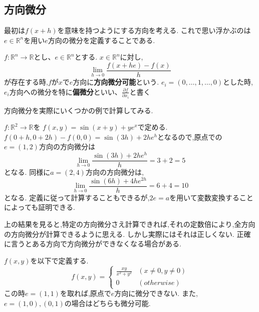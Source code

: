 \subsection{方向微分}
最初は$f(x+h)$を意味を持つようにする方向を考える.
これで思い浮かぶのは$e \in \mathbb{R}^n$を用い$e$方向の微分を定義することである.
\begin{dfn}
$f:\mathbb{R}^n \to \mathbb{R}$とし、$e \in \mathbb{R}^n$とする.
$x \in \mathbb{R}^n$に対し,
\begin{equation*}
  \lim_{h\to0}\frac{f(x + he) - f(x)}{h}
\end{equation*}
が存在する時,$f$が$x$で$e$方向に\textbf{方向微分可能}という.
$e_i = (0, \ldots, 1, \ldots, 0)$とした時,$e_i$方向への微分を特に\textbf{偏微分}といい、$\frac{\partial f}{\partial x_i}$と書く
\end{dfn}

方向微分を実際にいくつかの例で計算してみる.
\begin{epl}
$f: \mathbb{R}^2 \to \mathbb{R}$を
$f(x, y) = \sin(x+y) + ye^x$で定める.
$f(0+h, 0+2h) - f(0, 0) = \sin(3h) + 2he^h$となるので,原点での$e = (1 ,2)$方向の方向微分は
\begin{equation*}
\lim_{h \to 0} \frac{\sin(3h) + 2he^h }{h} = 3 + 2 = 5
\end{equation*}
となる.
同様に$a = (2, 4)$方向の方向微分は,
\begin{equation*}
\lim_{h \to 0} \frac{\sin(6h) + 4he^{2h} }{h} = 6 + 4 = 10
\end{equation*}
となる.
定義に従って計算することもできるが,$2e = a$を用いて変数変換することによっても証明できる.
\end{epl}

上の結果を見ると,特定の方向微分さえ計算できれば,それの定数倍により,全方向の方向微分が計算できるように思える.
しかし実際にはそれは正しくない.
正確に言うとある方向で方向微分ができなくなる場合がある.
\begin{epl}
$f(x, y)$を以下で定義する.
\begin{equation*}
  f(x,y) = \begin{cases}
  \frac{xy}{x^2 + y^2}  & (x \neq 0, y \neq 0) \\
  0  & (otherwise)
  \end{cases}
\end{equation*}
この時$e = (1, 1)$を取れば,原点で$e$方向に微分できない.
また,$e = (1, 0), (0, 1)$の場合はどちらも微分可能.
\end{epl}


